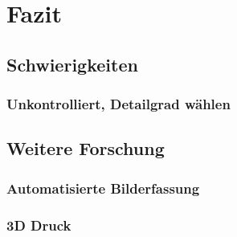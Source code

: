 \chapter{Fazit}
	\section{Schwierigkeiten}
		\subsection{Unkontrolliert, Detailgrad wählen}
		
	\section{Weitere Forschung}
		\subsection{Automatisierte Bilderfassung}
		\subsection{3D Druck}
	